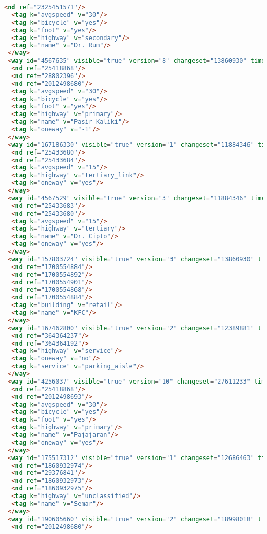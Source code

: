 \begin{lstlisting}[language=HTML,basicstyle=\tiny,caption=test.xml]
  <nd ref="2325451571"/>
  <tag k="avgspeed" v="30"/>
  <tag k="bicycle" v="yes"/>
  <tag k="foot" v="yes"/>
  <tag k="highway" v="secondary"/>
  <tag k="name" v="Dr. Rum"/>
 </way>
 <way id="4567635" visible="true" version="8" changeset="13860930" timestamp="2012-11-13T15:42:43Z" user="yudiwbs" uid="268765">
  <nd ref="25418868"/>
  <nd ref="28802396"/>
  <nd ref="2012498680"/>
  <tag k="avgspeed" v="30"/>
  <tag k="bicycle" v="yes"/>
  <tag k="foot" v="yes"/>
  <tag k="highway" v="primary"/>
  <tag k="name" v="Pasir Kaliki"/>
  <tag k="oneway" v="-1"/>
 </way>
 <way id="167186330" visible="true" version="1" changeset="11884346" timestamp="2012-06-13T12:22:01Z" user="andryono" uid="643030">
  <nd ref="25433680"/>
  <nd ref="25433684"/>
  <tag k="avgspeed" v="15"/>
  <tag k="highway" v="tertiary_link"/>
  <tag k="oneway" v="yes"/>
 </way>
 <way id="4567529" visible="true" version="3" changeset="11884346" timestamp="2012-06-13T12:22:06Z" user="andryono" uid="643030">
  <nd ref="25433683"/>
  <nd ref="25433680"/>
  <tag k="avgspeed" v="15"/>
  <tag k="highway" v="tertiary"/>
  <tag k="name" v="Dr. Cipto"/>
  <tag k="oneway" v="yes"/>
 </way>
 <way id="157803724" visible="true" version="3" changeset="13860930" timestamp="2012-11-13T15:47:32Z" user="yudiwbs" uid="268765">
  <nd ref="1700554884"/>
  <nd ref="1700554892"/>
  <nd ref="1700554901"/>
  <nd ref="1700554868"/>
  <nd ref="1700554884"/>
  <tag k="building" v="retail"/>
  <tag k="name" v="KFC"/>
 </way>
 <way id="167462800" visible="true" version="2" changeset="12389881" timestamp="2012-07-20T20:14:38Z" user="OSMF Redaction Account" uid="722137">
  <nd ref="364364237"/>
  <nd ref="364364192"/>
  <tag k="highway" v="service"/>
  <tag k="oneway" v="no"/>
  <tag k="service" v="parking_aisle"/>
 </way>
 <way id="4256037" visible="true" version="10" changeset="27611233" timestamp="2014-12-21T15:25:04Z" user="gnocin" uid="2526082">
  <nd ref="25418868"/>
  <nd ref="2012498693"/>
  <tag k="avgspeed" v="30"/>
  <tag k="bicycle" v="yes"/>
  <tag k="foot" v="yes"/>
  <tag k="highway" v="primary"/>
  <tag k="name" v="Pajajaran"/>
  <tag k="oneway" v="yes"/>
 </way>
 <way id="175517312" visible="true" version="1" changeset="12686463" timestamp="2012-08-11T00:36:04Z" user="ferdyodin" uid="796044">
  <nd ref="1860932974"/>
  <nd ref="29376841"/>
  <nd ref="1860932973"/>
  <nd ref="1860932975"/>
  <tag k="highway" v="unclassified"/>
  <tag k="name" v="Semar"/>
 </way>
 <way id="190605660" visible="true" version="2" changeset="18998018" timestamp="2013-11-19T17:23:36Z" user="ubanovic" uid="1784103">
  <nd ref="2012498680"/>

\end{lstlisting}
